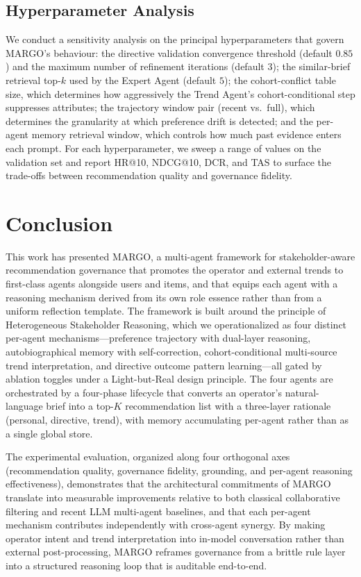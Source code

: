 \documentclass[master,english,final]{postech-ucs}
\begin{document}
\section{Hyperparameter Analysis}

We conduct a sensitivity analysis on the principal hyperparameters that govern MARGO's behaviour: the directive validation convergence threshold (default $0.85$) and the maximum number of refinement iterations (default $3$); the similar-brief retrieval top-$k$ used by the Expert Agent (default $5$); the cohort-conflict table size, which determines how aggressively the Trend Agent's cohort-conditional step suppresses attributes; the trajectory window pair (recent vs.\ full), which determines the granularity at which preference drift is detected; and the per-agent memory retrieval window, which controls how much past evidence enters each prompt.
For each hyperparameter, we sweep a range of values on the validation set and report HR@10, NDCG@10, DCR, and TAS to surface the trade-offs between recommendation quality and governance fidelity.

\chapter{Conclusion}

This work has presented MARGO, a multi-agent framework for stakeholder-aware recommendation governance that promotes the operator and external trends to first-class agents alongside users and items, and that equips each agent with a reasoning mechanism derived from its own role essence rather than from a uniform reflection template.
The framework is built around the principle of Heterogeneous Stakeholder Reasoning, which we operationalized as four distinct per-agent mechanisms---preference trajectory with dual-layer reasoning, autobiographical memory with self-correction, cohort-conditional multi-source trend interpretation, and directive outcome pattern learning---all gated by ablation toggles under a Light-but-Real design principle.
The four agents are orchestrated by a four-phase lifecycle that converts an operator's natural-language brief into a top-$K$ recommendation list with a three-layer rationale (personal, directive, trend), with memory accumulating per-agent rather than as a single global store.

The experimental evaluation, organized along four orthogonal axes (recommendation quality, governance fidelity, grounding, and per-agent reasoning effectiveness), demonstrates that the architectural commitments of MARGO translate into measurable improvements relative to both classical collaborative filtering and recent LLM multi-agent baselines, and that each per-agent mechanism contributes independently with cross-agent synergy.
By making operator intent and trend interpretation into in-model conversation rather than external post-processing, MARGO reframes governance from a brittle rule layer into a structured reasoning loop that is auditable end-to-end.
\end{document}
